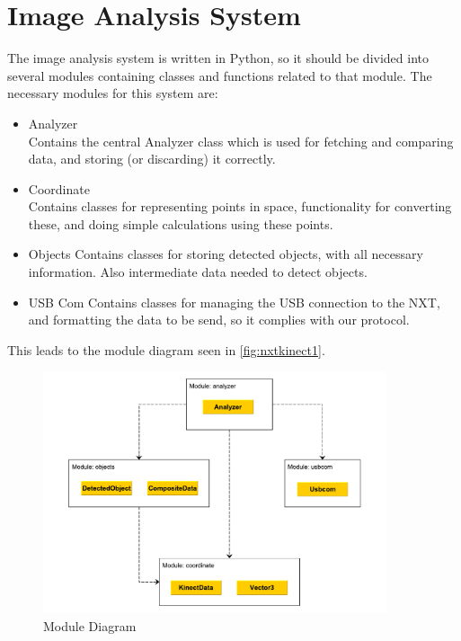 \section{Image Analysis System}

The image analysis system is written in Python, so it should be divided into several modules containing classes
and functions related to that module. The necessary modules for this system are:
\begin{itemize}
  \item{Analyzer}\\
  Contains the central Analyzer class which is used for fetching and comparing data, and storing (or discarding) it
  correctly.
  \item{Coordinate}\\
  Contains classes for representing points in space, functionality for converting these, and doing simple calculations
  using these points.
  \item{Objects}
  Contains classes for storing detected objects, with all necessary information. Also intermediate data needed to
  detect objects.
  \item{USB Com}
  Contains classes for managing the USB connection to the NXT, and formatting the data to be send, so it complies with
  our protocol.
\end{itemize}

This leads to the module diagram seen in \autoref{fig:nxtkinect1}.

\begin{figure}[hbtp]
\includegraphics[width=0.90\textwidth]{img/nxtkinect1.pdf}
\caption{Module Diagram} 
\label{fig:nxtkinect1} 
\end{figure}

